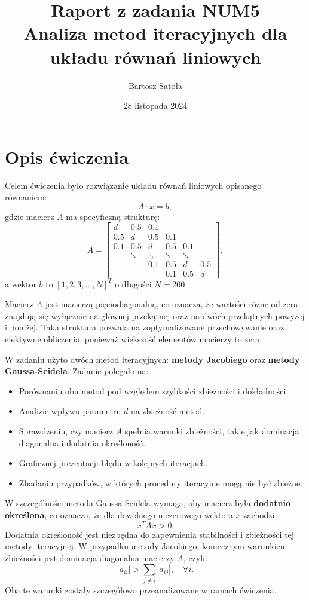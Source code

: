 \documentclass[a4paper,12pt]{article}
\title{Raport z zadania NUM5 \\ \large Analiza metod iteracyjnych dla układu równań liniowych}
\author{Bartosz Satoła}
\date{28 listopada 2024}
\begin{document}
\maketitle

\tableofcontents
\newpage

\section{Opis ćwiczenia}

Celem ćwiczenia było rozwiązanie układu równań liniowych opisanego równaniem:
\[
A \cdot x = b,
\]
gdzie macierz \(A\) ma specyficzną strukturę:
\[
A =
\begin{bmatrix}
d & 0.5 & 0.1 & & & \\
0.5 & d & 0.5 & 0.1 & & \\
0.1 & 0.5 & d & 0.5 & 0.1 & \\
& \ddots & \ddots & \ddots & \ddots & \\
& & 0.1 & 0.5 & d & 0.5 \\
& & & 0.1 & 0.5 & d
\end{bmatrix},
\]
a wektor \(b\) to \([1, 2, 3, \ldots, N]^T\) o długości \(N = 200\).

Macierz \(A\) jest macierzą pięciodiagonalną, co oznacza, że wartości różne od zera znajdują się wyłącznie na głównej przekątnej oraz na dwóch przekątnych powyżej i poniżej. Taka struktura pozwala na zoptymalizowane przechowywanie oraz efektywne obliczenia, ponieważ większość elementów macierzy to zera.

W zadaniu użyto dwóch metod iteracyjnych: \textbf{metody Jacobiego} oraz \textbf{metody Gaussa-Seidela}. Zadanie polegało na:
\begin{itemize}
    \item Porównaniu obu metod pod względem szybkości zbieżności i dokładności.
    \item Analizie wpływu parametru \(d\) na zbieżność metod.
    \item Sprawdzeniu, czy macierz \(A\) spełnia warunki zbieżności, takie jak dominacja diagonalna i dodatnia określoność.
    \item Graficznej prezentacji błędu w kolejnych iteracjach.
    \item Zbadaniu przypadków, w których procedury iteracyjne mogą nie być zbieżne.
\end{itemize}

W szczególności metoda Gaussa-Seidela wymaga, aby macierz była \textbf{dodatnio określona}, co oznacza, że dla dowolnego niezerowego wektora \(x\) zachodzi:
\[
x^T A x > 0.
\]
Dodatnia określoność jest niezbędna do zapewnienia stabilności i zbieżności tej metody iteracyjnej. W przypadku metody Jacobiego, koniecznym warunkiem zbieżności jest dominacja diagonalna macierzy \(A\), czyli:
\[
|a_{ii}| > \sum_{j \neq i} |a_{ij}|, \quad \forall i.
\]
Oba te warunki zostały szczegółowo przeanalizowane w ramach ćwiczenia.
\end{document}
